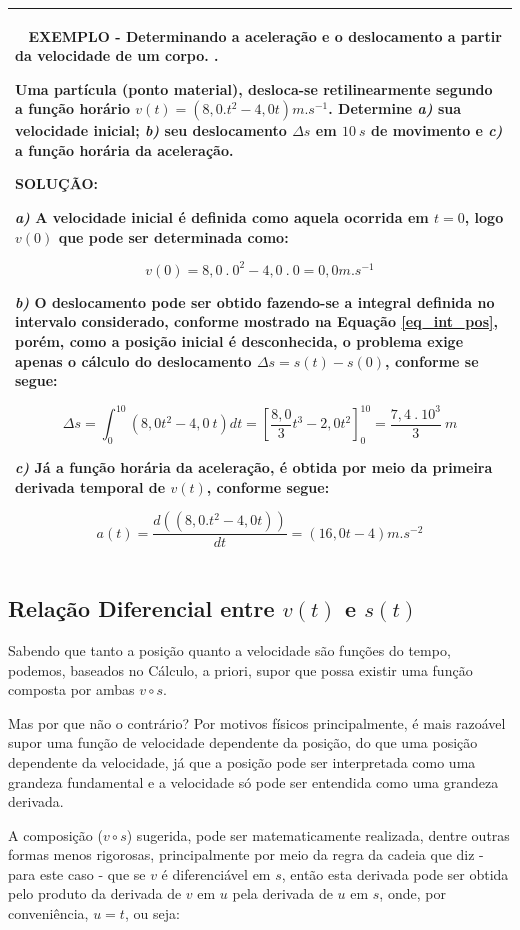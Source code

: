 \documentclass[a4paper, 11pt]{report}
\newenvironment{myboxed}
    {
        \begin{center}
        \begin{tabular}{p{0.7\textwidth}}
        \hline\
    }
    { 
        \\\hline
        \end{tabular} 
        \end{center}
    }
\begin{document}
\begin{myboxed}
    \textbf{EXEMPLO - Determinando a aceleração e o deslocamento a partir da
    velocidade de um corpo. .}

    Uma partícula (ponto material), desloca-se retilinearmente segundo a função
    horário $v(t) = (8,0.t^2-4,0t)m.s^{-1}$. Determine \emph{a)} sua velocidade 
    inicial; \emph{b)} seu deslocamento $\Delta s$ em $10 \: s$ de movimento e 
    \emph{c)} a função horária da aceleração. 

    \textbf{SOLUÇÃO:}

    \emph{a)} A velocidade inicial é definida como aquela ocorrida em $t=0$, 
    logo $v(0)$ que pode ser determinada como:
    
    $$
        v(0) = 8,0\:.\:0^2 - 4,0\:.\:0 = 0,0 m.s^{-1}
    $$

    \emph{b)} O deslocamento pode ser obtido fazendo-se a integral definida no 
    intervalo considerado, conforme mostrado na Equação \ref{eq_int_pos}, 
    porém, como a posição inicial é desconhecida, o problema exige apenas o 
    cálculo do deslocamento $\Delta s = s(t) - s(0)$, conforme se segue:

    $$
    \Delta s = \int_0^{10} (8,0t^2-4,0\:t) dt = \left[ \frac{8,0}{3} t^3 - 2,0 t^2\right]_0^{10} = \frac{7,4 \: . \: 10^3}{ 3} \: m
    $$

    \emph{c)} Já a função horária da aceleração, é obtida por meio da primeira 
    derivada temporal de $v(t)$, conforme segue:

    $$
    a(t) = \frac{d((8,0.t^2-4,0t))}{dt} = (16,0 t - 4) m.s^{-2}
    $$

\end{myboxed}

\subsection{Relação Diferencial entre $v(t)$ e $s(t)$}
Sabendo que tanto a posição quanto a velocidade são funções do tempo, 
podemos, baseados no Cálculo, a priori, supor que possa existir uma função 
composta por ambas $v \circ s$. 

Mas por que não o contrário? Por motivos físicos principalmente, é mais 
razoável supor uma função de velocidade dependente da posição, do que uma 
posição dependente da velocidade, já que a posição pode ser interpretada 
como uma grandeza fundamental e a velocidade só pode ser entendida como 
uma grandeza derivada.

A composição ($v \circ s$) sugerida, pode ser matematicamente realizada, 
dentre outras formas menos rigorosas, principalmente por meio da regra da cadeia 
que diz - para este caso - que se $v$ é diferenciável em $s$, então esta 
derivada pode ser obtida pelo produto da derivada de $v$ em $u$ pela 
derivada de $u$ em $s$, onde, por conveniência, $u=t$, ou seja:
\end{document}
